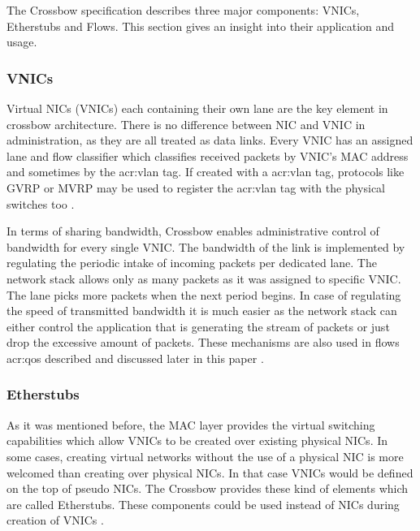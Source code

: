 \documentclass[11pt]{book}
\begin{document}
        The Crossbow specification describes three major components: VNICs, Etherstubs and Flows. This section gives an
        insight into their application and usage.

                
        \subsubsection{VNICs}
        
          Virtual NICs (VNICs) each containing their own lane are the key element in crossbow architecture. There is no
          difference between NIC and VNIC in administration, as they are all treated as data links. Every VNIC has an
          assigned lane and flow classifier which classifies received packets by VNIC's MAC address and sometimes by the
          \gls{acr:vlan} tag.  If created with a \gls{acr:vlan} tag, protocols like GVRP or MVRP may be used to register the
          \gls{acr:vlan} tag with the physical switches too \cite{crossbow}.	

          In terms of sharing bandwidth, Crossbow enables administrative control of bandwidth for every single VNIC. The
          bandwidth of the link is implemented by regulating the periodic intake of incoming packets per dedicated lane.
          The network stack allows only as many packets as it was assigned to specific VNIC. The lane picks more packets
          when the next period begins. In case of regulating the speed of transmitted bandwidth it is much easier as the
          network stack can either control the application that is generating the stream of packets or just drop the
          excessive amount of packets.  These mechanisms are also used in flows \gls{acr:qos} described and discussed later in
          this paper \cite{crossbow}.


        \subsubsection{Etherstubs}

          As it was mentioned before, the MAC layer provides the virtual switching capabilities which allow VNICs to be
          created over existing physical NICs.  In some cases, creating virtual networks without the use of a physical
          NIC is more welcomed than creating over physical NICs. In that case VNICs would be defined on the top of
          pseudo NICs.  The Crossbow provides these kind of elements which are called Etherstubs. These components could
          be used instead of NICs during creation of VNICs \cite{crossbow}.
\end{document}
